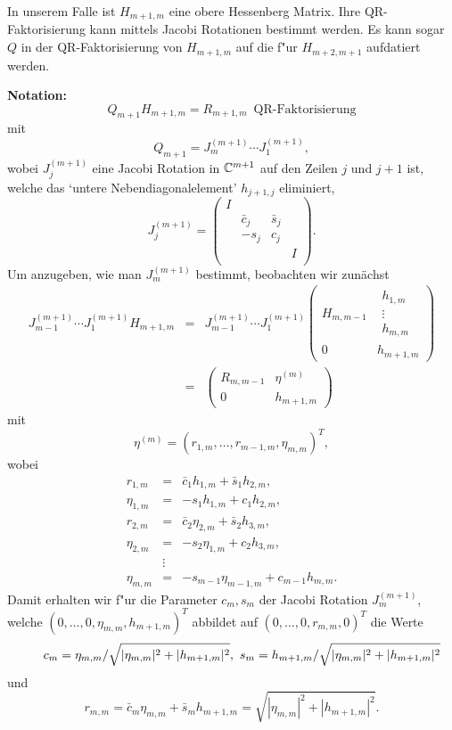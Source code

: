 In unserem Falle ist $H_{m+1,m}$ eine obere Hessenberg Matrix. Ihre QR-Fak\-to\-ri\-sierung
kann mittels Jacobi Rotationen bestimmt werden. Es kann sogar $Q$ in der
QR-Faktorisierung von $H_{m+1,m}$ auf die f"ur $H_{m+2,m+1}$ aufdatiert werden.

\bigskip

{\bf Notation:}
\[
Q_{m+1} H_{m+1,m} = R_{m+1,m} \enspace \mbox{QR-Faktorisierung}
\]
mit
\[
Q_{m+1} = J_m^{(m+1)}\cdots J_1^{(m+1)},
\]
wobei $J_j^{(m+1)}$ eine Jacobi Rotation in $\mathbb{C}^{m+1}$ auf den Zeilen $j$
und $j+1$ ist, welche das `untere Nebendiagonalelement' $h_{j+1,j}$ eliminiert,
\[
J_j^{(m+1)} = \left(%
\begin{array}{cccc}
  I &  &  &  \\
   & \bar{c}_j & \bar{s}_j &  \\
   & -s_j & c_j &  \\
   &  &  & I \\
\end{array}%
\right).
\]
Um anzugeben, wie man $J_m^{(m+1)}$ bestimmt, beobachten wir zun\"achst
\begin{eqnarray*}
J_{m-1}^{(m+1)} \cdots J_1^{(m+1)} H_{m+1,m} &=& J_{m-1}^{(m+1)} \cdots J_1^{(m+1)}
    \left(\begin{array}{c|c} 
  H_{m,m-1}& \begin{array}{c}
           h_{1,m} \\
  \vdots \\
h_{m,m}
  \end{array}\\
\hline
  0         & h_{m+1,m}
  \end{array}
 \right) \\
&=&
    \left( \begin{array}{cc}
  R_{m,m-1} & \eta^{(m)} \\
  0         & h_{m+1,m}
  \end{array}
 \right)
\end{eqnarray*}
mit
\[
\eta^{(m)} = (r_{1,m},\ldots,r_{m-1,m},\eta_{m,m})^T,
\]
wobei
\begin{eqnarray*}
r_{1,m} &=& \bar{c}_1h_{1,m} + \bar{s}_1h_{2,m}, \\
\eta_{1,m} &=& -s_1h_{1,m} + c_1h_{2,m}, \\
r_{2,m} &=& \bar{c}_2\eta_{2,m} + \bar{s}_2h_{3,m}, \\
\eta_{2,m} &=& -s_2\eta_{1,m} + c_2h_{3,m}, \\
& \vdots & \\
\eta_{m,m} &=& -s_{m-1}\eta_{m-1,m} + c_{m-1}h_{m,m} .
\end{eqnarray*}
Damit erhalten wir f"ur die Parameter $c_m,s_m$ der Jacobi Rotation
$J^{(m+1)}_m$, welche $(0,\ldots,0,\eta_{m,m},h_{m+1,m})^T$ abbildet auf
$(0,\ldots,0,r_{m,m},0)^T$ die Werte 
\begin{equation} \label{rotparam_eq}
  c_m = \eta_{m,m}/\sqrt{|\eta_{m,m}|^2 + |h_{m+1,m}|^2}, \
s_m = h_{m+1,m}/\sqrt{|\eta_{m,m}|^2 + |h_{m+1,m}|^2}  \hspace*{-0.6cm}
\end{equation}
und
\[
r_{m,m} = \bar{c}_m\eta_{m,m} + \bar{s}_mh_{m+1,m} = \sqrt{|\eta_{m,m}|^2 + |h_{m+1,m}|^2} .
\]

